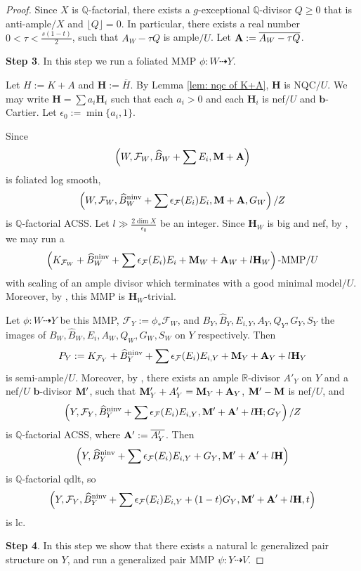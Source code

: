 \documentclass[12pt]{amsart}
\numberwithin{equation}{section}
\newcommand{\bb}{\bm{b}}
\newcommand{\Mm}{{\bf{M}}}
\newcommand{\Qq}{\mathbb{Q}}
\newcommand{\Rr}{\mathbb{R}}
\newcommand{\Hh}{\mathbf{H}}
\newcommand{\ninv}{\operatorname{ninv}}
\newcommand{\Aa}{{\bf{A}}}
\newcommand{\Ff}{\mathcal{F}}
\theoremstyle{definition}
\theoremstyle{definition}
\theoremstyle{definition}
\begin{document}
\begin{proof}
Since $X$ is $\Qq$-factorial, there exists a $g$-exceptional $\Qq$-divisor $Q\geq 0$ that is anti-ample$/X$ and $\lfloor Q\rfloor=0$. In particular, there exists a real number $0<\tau<\frac{s(1-t)}{2}$, such that $A_W-\tau Q$ is ample$/U$. Let $\Aa:=\overline{A_W-\tau Q}$.

\medskip

\noindent\textbf{Step 3}. In this step we run a foliated MMP $\phi: W\dashrightarrow Y$.

Let $H:=K+A$ and $\Hh:=\overline{H}$. By Lemma \ref{lem: nqc of K+A}, $\Hh$ is NQC$/U$. We may write $\Hh=\sum a_i\Hh_i$ such that each $a_i>0$ and each $\Hh_i$ is nef$/U$ and $\bb$-Cartier. Let $\epsilon_0:=\min\{a_i,1\}$.

Since $$\left(W,\Ff_W,\widehat B_W+\sum E_i,\Mm+\Aa\right)$$ is foliated log smooth, 
$$\left(W,\Ff_W,\widehat{B}_W^{\ninv}+\sum \epsilon_{\Ff}(E_i)E_i,\Mm+\Aa,G_W\right)/Z$$
is $\Qq$-factorial ACSS. Let $l\gg\frac{2\dim X}{\epsilon_0}$ be an integer. Since $\Hh_W$ is big and nef, by \cite[Theorem 16.1.4]{CHLX23}, we may run a 
$$\left(K_{\Ff_W}+\widehat{B}_W^{\ninv}+\sum \epsilon_{\Ff}(E_i)E_i+\Mm_W+\Aa_W+l\Hh_W\right)\text{-MMP}/U$$ with scaling of an ample divisor which terminates with a good minimal model$/U$. Moreover, by \cite[Lemma B.6]{LMX24b}, this MMP is $\Hh_W$-trivial.
  
Let $\phi: W\dashrightarrow Y$ be this MMP, $\Ff_Y:=\phi_\ast \Ff_W$, and $B_Y,\widehat{B}_Y,E_{i,Y},A_Y,Q_Y,G_Y,S_Y$ the images of $B_W,\widehat{B}_W,E_{i},A_W,Q_W,G_W,S_W$ on $Y$ respectively. Then
$$P_Y:=K_{\Ff_Y}+\widehat{B}_Y^{\ninv}+\sum\epsilon_{\Ff}(E_i)E_{i,Y}+\Mm_Y+\Aa_Y+l\Hh_Y$$
is semi-ample$/U$. Moreover, by \cite[Lemma 16.1.1]{CHLX23}, there exists an ample $\Rr$-divisor $A'_Y$ on $Y$ and a nef$/U$ $\bb$-divisor $\Mm'$, such that $\Mm'_Y+A'_Y=\Mm_Y+\Aa_Y$, $\Mm'-\Mm$ is nef$/U$, and $$\left(Y,\Ff_Y,\widehat{B}_Y^{\ninv}+\sum\epsilon_{\Ff}(E_i)E_{i,Y},\Mm'+\Aa'+l\Hh;G_Y\right)/Z$$ 
is $\Qq$-factorial ACSS, where $\Aa':=\overline{A'_Y}$. Then
$$\left(Y,\widehat{B}_Y^{\ninv}+\sum\epsilon_{\Ff}(E_i)E_{i,Y}+G_Y,\Mm'+\Aa'+l\Hh\right)$$
is $\Qq$-factorial qdlt, so
$$\left(Y,\Ff_Y,\widehat{B}_Y^{\ninv}+\sum\epsilon_{\Ff}(E_i)E_{i,Y}+(1-t)G_Y,\Mm'+\Aa'+l\Hh,t\right)$$
is lc.

\medskip

\noindent\textbf{Step 4}. In this step we show that there exists a natural lc generalized pair structure on $Y$, and run a generalized pair MMP  $\psi: Y\dashrightarrow V$. 



\end{proof}
\end{document}
